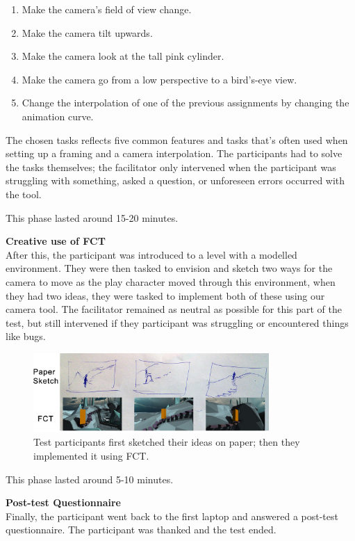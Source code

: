 \begin{enumerate}
\item Make the camera's field of view change.
\item Make the camera tilt upwards.
\item Make the camera look at the tall pink cylinder.
\item Make the camera go from a low perspective to a bird's-eye view.
\item Change the interpolation of one of the previous assignments by changing the animation curve.
\end{enumerate} 

The chosen tasks reflects five common features and tasks that's often used when setting up a framing and a camera interpolation. The participants had to solve the tasks themselves; the facilitator only intervened when the participant was struggling with something, asked a question, or unforeseen errors occurred with the tool.

This phase lasted around 15-20 minutes.

\textbf{Creative use of FCT}\\
After this, the participant was introduced to a level with a modelled environment. They were then tasked to envision and sketch two ways for the camera to move as the play character moved through this environment, when they had two ideas, they were tasked to implement both of these using our camera tool. The facilitator remained as neutral as possible for this part of the test, but still intervened if they participant was struggling or encountered things like bugs.



\begin{figure}[htbp]
\centering
\includegraphics[width=0.8\textwidth]{Pics/Sketching_Framings}
\caption{Test participants first sketched their ideas on paper; then they implemented it using FCT.}
\label{fig:Sketching_Framings}
\end{figure}

This phase lasted around 5-10 minutes.

\textbf{Post-test Questionnaire}\\
Finally, the participant went back to the first laptop and answered a post-test questionnaire. The participant was thanked and the test ended.